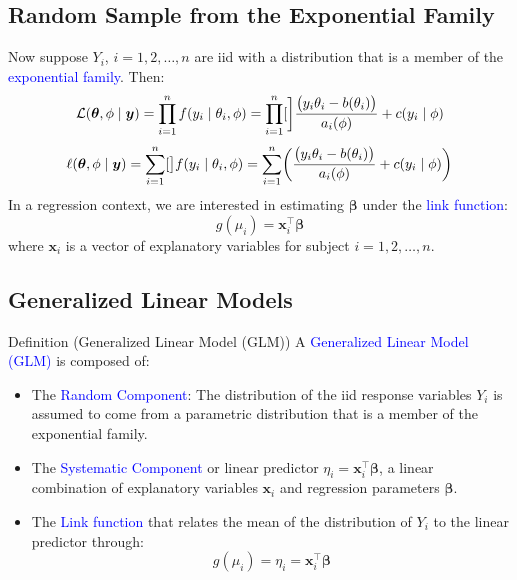 \documentclass[oneside]{book}\usepackage[]{graphicx}\usepackage[svgnames]{xcolor}
\let\exp\relax%
\let\log\relax%
\providecommand{\Vector}[1]{\bm{#1}}%
\begin{document}
\subsection*{Random Sample from the Exponential Family}
Now suppose $ Y_i $, $ i=1,2,\ldots,n $ are iid with a distribution that is a member of the
\textcolor{Blue}{exponential family}. Then:
\[ \mathcal{L}(\Vector{\theta},\phi\mid \Vector{y})=\prod_{i=1}^n f(y_i\mid \theta_i,\phi)=\prod_{i=1}^n\exp[\bigg]{\frac{\bigl(y_i\theta_i-b(\theta_i)\bigr)}{a_i(\phi)}+c(y_i\mid \phi)} \]
\[ \ell(\Vector{\theta},\phi\mid \Vector{y})=\sum_{i=1}^n \log[\big]{f(y_i\mid \theta_i,\phi)}=\sum_{i=1}^n \biggl(\frac{\bigl(y_i\theta_i-b(\theta_i)\bigr)}{a_i(\phi)}+c(y_i\mid \phi)\biggr) \]
In a regression context, we are interested in estimating $ \Vector{\beta} $ under the \textcolor{Blue}{link function}:
\[ g(\mu_i)=\Vector{x}_i^\top\Vector{\beta} \]
where $ \Vector{x}_i $ is a vector of explanatory variables for subject $ i=1,2,\ldots, n $.
\subsection*{Generalized Linear Models}
\begin{Regular}{Definition (Generalized Linear Model (GLM))}
      A \textcolor{Blue}{Generalized Linear Model (GLM)} is composed of:
      \begin{itemize}
            \item The \textcolor{Blue}{Random Component}: The distribution of the iid response variables $ Y_i $ is
                  assumed to come from a parametric distribution that is a member of the
                  exponential family.
            \item The \textcolor{Blue}{Systematic Component} or linear predictor $ \eta_i=\Vector{x}_i^\top\Vector{\beta} $, a linear combination of
                  explanatory variables $ \Vector{x}_i $ and regression parameters $ \Vector{\beta} $.
            \item The \textcolor{Blue}{Link function} that relates the mean of the distribution of $ Y_i $ to the linear
                  predictor through:
                  \[ g(\mu_i)=\eta_i=\Vector{x}_i^\top\Vector{\beta} \]
      \end{itemize}
\end{Regular}
\end{document}
